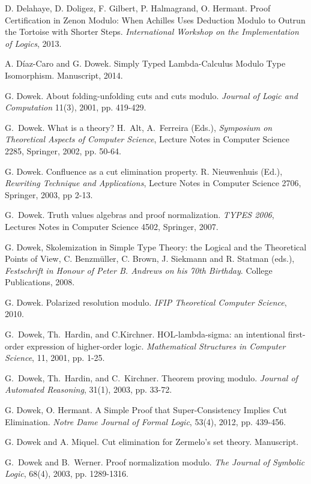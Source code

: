 \documentclass{llncs}
\begin{document}
\begin{thebibliography}{99.}
D. Delahaye, D. Doligez, F. Gilbert, P. Halmagrand, O. Hermant.
Proof Certiﬁcation in Zenon Modulo: When Achilles Uses Deduction Modulo to 
Outrun the Tortoise with Shorter Steps.
{\em International Workshop on the Implementation of Logics}, 2013.

A. D\'iaz-Caro and G. Dowek.
Simply Typed Lambda-Calculus Modulo Type Isomorphism.
Manuscript, 2014.

G. Dowek.
About folding-unfolding cuts and cuts modulo.
{\em Journal of Logic and Computation} 11(3), 2001, pp. 419-429.

G.~Dowek.
What is a theory?
H.~Alt, A.~Ferreira (Eds.), {\em Symposium on Theoretical Aspects of Computer 
Science}, Lecture Notes in Computer Science 2285, Springer,
2002, pp. 50-64. 

G. Dowek.
Confluence as a cut elimination property.
R. Nieuwenhuis (Ed.), {\em Rewriting Technique and Applications}, 
Lecture Notes in Computer Science 2706, Springer, 2003, pp 2-13. 

G.~Dowek.
Truth values algebras and proof normalization.
{\em TYPES 2006}, Lectures Notes in Computer Science 4502, Springer, 2007.

G. Dowek, Skolemization in Simple Type Theory: the Logical and the 
Theoretical Points of View, C. Benzmüller, C. Brown, J. Siekmann and 
R. Statman (eds.), {\em Festschrift in Honour of Peter B. Andrews on his 
70th Birthday}. College Publications, 2008. 

G. Dowek. 
Polarized resolution modulo.
{\em IFIP Theoretical Computer Science}, 2010. 

G.~Dowek, Th.~Hardin, and C.Kirchner.
HOL-lambda-sigma: an intentional first-order expression of
higher-order logic.
{\em Mathematical Structures in Computer Science}, 11, 2001, pp. 1-25.  

G.~Dowek, Th.~Hardin, and C.~Kirchner.
Theorem proving modulo.
{\em Journal of Automated Reasoning}, 31(1), 2003, pp. 33-72.  

G. Dowek, O. Hermant.
A Simple Proof that Super-Consistency Implies Cut Elimination. 
{\em Notre Dame Journal of Formal Logic}, 53(4), 2012, pp. 439-456.

G. Dowek and A. Miquel.
Cut elimination for Zermelo's set theory.
Manuscript.

G.~Dowek and B.~Werner.  
Proof normalization modulo.  
{\em The Journal of Symbolic Logic}, 68(4), 2003, pp. 1289-1316.


\end{thebibliography}
\end{document}
